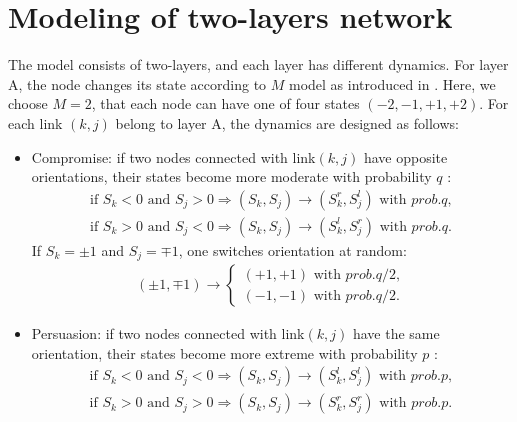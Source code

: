\section{Modeling of two-layers network}
\label{sec:modeling of two layer network}
The model consists of two-layers, and each layer has different dynamics. For layer A, the node changes its state according to $M$ model as introduced in \parencite{rocca2014}. Here, we choose $M=2$, that each node can have one of four states $(-2, -1, +1, +2)$. For each link $(k, j)$ belong to layer A,  the dynamics are designed as follows:
\begin{itemize}
	\item Compromise: if two nodes connected with link$(k, j)$ have opposite orientations, their states become more moderate with probability $q$ :
	\begin{align}
	\mbox{if } S_k<0 \mbox{ and } S_j>0  \Rightarrow (S_k, S_j) \rightarrow (S_k^r, S_j^l) \mbox{ with } prob.q,\\
	\mbox{if } S_k>0 \mbox{ and } S_j<0  \Rightarrow (S_k, S_j) \rightarrow (S_k^l, S_j^r) \mbox{ with } prob.q.
	\end{align}
	If $S_k = \pm1$ and $S_j = \mp1$, one switches orientation at random:
	\begin{align}
	(\pm 1, \mp 1)\rightarrow \left\{\begin{matrix}
	(+1, +1) \mbox{ with } prob.q/2,
	\\(-1, -1)\mbox{ with } prob.q/2.
	\end{matrix}\right.
	\end{align}
		
	\item Persuasion: if two nodes connected with link$(k, j)$ have the same orientation, their states become more extreme with probability $p$ :
	\begin{align}
	\mbox{if } S_k<0 \mbox{ and } S_j<0  \Rightarrow (S_k, S_j) \rightarrow (S_k^l, S_j^l) \mbox{ with } prob.p,\\
	\mbox{if } S_k>0 \mbox{ and } S_j>0  \Rightarrow (S_k, S_j) \rightarrow (S_k^r, S_j^r) \mbox{ with } prob.p.
	\end{align}
\end{itemize}

